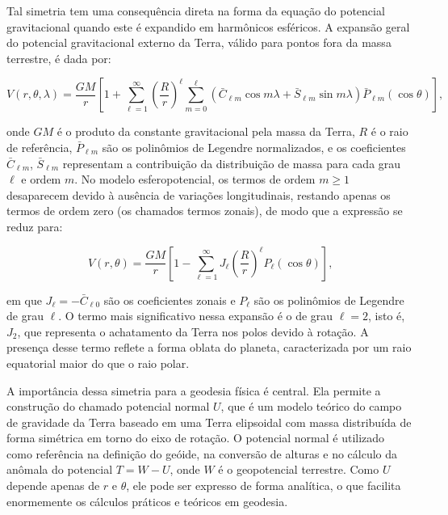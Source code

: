 Tal simetria tem uma consequência direta na forma da equação do potencial gravitacional quando este é expandido em harmônicos esféricos. A expansão geral do potencial gravitacional externo da Terra, válido para pontos fora da massa terrestre, é dada por:

\[
V(r, \theta, \lambda) = \frac{GM}{r} \left[1 + \sum_{\ell=1}^{\infty} \left( \frac{R}{r} \right)^\ell \sum_{m=0}^\ell \left( \bar{C}_{\ell m} \cos m\lambda + \bar{S}_{\ell m} \sin m\lambda \right) \bar{P}_{\ell m}(\cos \theta) \right] \text{,}
\]

onde \( GM \) é o produto da constante gravitacional pela massa da Terra, \( R \) é o raio de referência, \( \bar{P}_{\ell m} \) são os polinômios de Legendre normalizados, e os coeficientes \( \bar{C}_{\ell m} \), \( \bar{S}_{\ell m} \) representam a contribuição da distribuição de massa para cada grau \( \ell \) e ordem \( m \). No modelo esferopotencial, os termos de ordem \( m \geq 1 \) desaparecem devido à ausência de variações longitudinais, restando apenas os termos de ordem zero (os chamados termos zonais), de modo que a expressão se reduz para:

\[
V(r, \theta) = \frac{GM}{r} \left[1 - \sum_{\ell=1}^{\infty} J_\ell \left( \frac{R}{r} \right)^\ell P_\ell(\cos \theta) \right] \text{,}
\]

em que \( J_\ell = -\bar{C}_{\ell 0} \) são os coeficientes zonais e \( P_\ell \) são os polinômios de Legendre de grau \( \ell \). O termo mais significativo nessa expansão é o de grau \( \ell = 2 \), isto é, \( J_2 \), que representa o achatamento da Terra nos polos devido à rotação. A presença desse termo reflete a forma oblata do planeta, caracterizada por um raio equatorial maior do que o raio polar.

A importância dessa simetria para a geodesia física é central. Ela permite a construção do chamado potencial normal \( U \), que é um modelo teórico do campo de gravidade da Terra baseado em uma Terra elipsoidal com massa distribuída de forma simétrica em torno do eixo de rotação. O potencial normal é utilizado como referência na definição do geóide, na conversão de alturas e no cálculo da anômala do potencial \( T = W - U \), onde \( W \) é o geopotencial terrestre. Como \( U \) depende apenas de \( r \) e \( \theta \), ele pode ser expresso de forma analítica, o que facilita enormemente os cálculos práticos e teóricos em geodesia.



